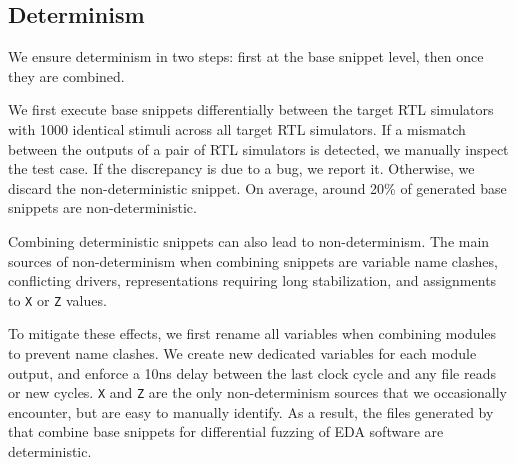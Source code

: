 \subsection{Determinism}
\label{sec:codegen:determinism}

We ensure determinism in two steps: first at the base snippet level, then once they are combined.

We first execute base snippets differentially between the target RTL simulators with 1000 identical stimuli across all target RTL simulators.
If a mismatch between the outputs of a pair of RTL simulators is detected, we manually inspect the test case.
If the discrepancy is due to a bug, we report it.
Otherwise, we discard the non-deterministic snippet.
On average, around 20\% of generated base snippets are non-deterministic.

Combining deterministic snippets can also lead to non-determinism.
The main sources of non-determinism when combining snippets are variable name clashes, conflicting drivers, representations requiring long stabilization, and assignments to \texttt{X} or \texttt{Z} values.

To mitigate these effects, we first rename all variables when combining modules to prevent name clashes. We create new dedicated variables for each module output, and enforce a 10ns delay between the last clock cycle and any file reads or new cycles.
\texttt{X} and \texttt{Z} are the only non-determinism sources that we occasionally encounter, but are easy to manually identify.
As a result, the files generated by \ourname that combine base snippets for differential fuzzing of EDA software are deterministic.
